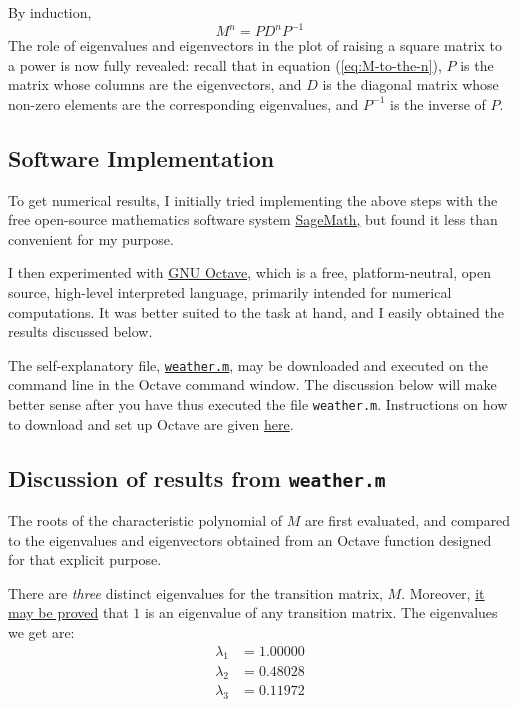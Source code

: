 \documentclass[
  12pt,
  a4paper,
]{article}
\begin{document}
By induction, \begin{equation}
M^{n} = PD^{n}P^{-1}
\label{eq:M-to-the-n}\end{equation} The role of eigenvalues and
eigenvectors in the plot of raising a square matrix to a power is now
fully revealed: recall that in equation (\ref{eq:M-to-the-n}), \(P\) is
the matrix whose columns are the eigenvectors, and \(D\) is the diagonal
matrix whose non-zero elements are the corresponding eigenvalues, and
\(P^{-1}\) is the inverse of \(P\).

\hypertarget{software-implementation}{%
\subsection{Software Implementation}\label{software-implementation}}

To get numerical results, I initially tried implementing the above steps
with the free open-source mathematics software system
\href{http://www.sagemath.org/}{SageMath,} but found it less than
convenient for my purpose.

I then experimented with \href{https://www.gnu.org/software/octave/}{GNU
Octave,} which is a free, platform-neutral, open source, high-level
interpreted language, primarily intended for numerical computations. It
was better suited to the task at hand, and I easily obtained the results
discussed below.

The self-explanatory file,
\href{auxiliary/weather.m}{\texttt{weather.m}}, may be downloaded and
executed on the command line in the Octave command window. The
discussion below will make better sense after you have thus executed the
file \texttt{weather.m}. Instructions on how to download and set up
Octave are given
\href{https://www.gnu.org/software/octave/download}{here}.

\hypertarget{discussion-of-results-from-weather.m}{%
\subsection{\texorpdfstring{Discussion of results from
\texttt{weather.m}}{Discussion of results from weather.m}}\label{discussion-of-results-from-weather.m}}

The roots of the characteristic polynomial of \(M\) are first evaluated,
and compared to the eigenvalues and eigenvectors obtained from an Octave
function designed for that explicit purpose.

There are \emph{three} distinct eigenvalues for the transition matrix,
\(M\). Moreover,
\href{http://www.math.cornell.edu/~mec/Winter2009/RalucaRemus/Lecture1/lecture1.html}{it
may be proved} that \(1\) is an eigenvalue of any transition matrix. The
eigenvalues we get are: \[
\begin{aligned}
\lambda_{1} &= 1.00000\\
\lambda_{2} &= 0.48028\\
\lambda_{3} &= 0.11972
\end{aligned}
\]
\end{document}
